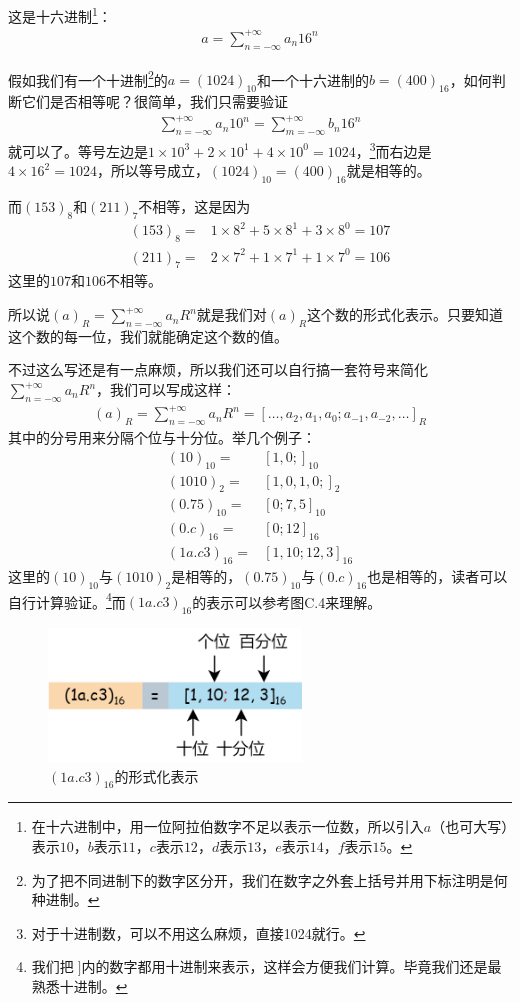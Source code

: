 这是十六进制\footnote{在十六进制中，用一位阿拉伯数字不足以表示一位数，所以引入$a$（也可大写）表示$10$，$b$表示$11$，$c$表示$12$，$d$表示$13$，$e$表示$14$，$f$表示$15$。}：
\begin{align*}
a=\sum_{n=-\infty}^{+\infty}a_n16^n
\end{align*}\par
假如我们有一个十进制\footnote{为了把不同进制下的数字区分开，我们在数字之外套上括号并用下标注明是何种进制。}的$a=(1024)_{10}$和一个十六进制的$b=(400)_{16}$，如何判断它们是否相等呢？很简单，我们只需要验证
\begin{align*}
\sum_{n=-\infty}^{+\infty}a_n10^n=\sum_{m=-\infty}^{+\infty}b_n16^n
\end{align*}
就可以了。等号左边是$1\times10^3+2\times10^1+4\times10^0=1024$，\footnote{对于十进制数，可以不用这么麻烦，直接1024就行。}而右边是$4\times16^2=1024$，所以等号成立，$(1024)_{10}=(400)_{16}$就是相等的。\par
而$(153)_8$和$(211)_7$不相等，这是因为
\begin{align*}
(153)_8={}&1\times8^2+5\times8^1+3\times8^0=107\\
(211)_7={}&2\times7^2+1\times7^1+1\times7^0=106
\end{align*}
这里的$107$和$106$不相等。\par
所以说$(a)_R=\sum_{n=-\infty}^{+\infty}a_nR^n$就是我们对$(a)_R$这个数的形式化表示。只要知道这个数的每一位，我们就能确定这个数的值。\par
不过这么写还是有一点麻烦，所以我们还可以自行搞一套符号来简化$\sum_{n=-\infty}^{+\infty}a_nR^n$，我们可以写成这样：
\begin{align*}
(a)_R=\sum_{n=-\infty}^{+\infty}a_nR^n=\left[\ldots,a_2,a_1,a_0;a_{-1},a_{-2},\ldots\right]_R
\end{align*}
其中的分号用来分隔个位与十分位。举几个例子：
\begin{align*}
(10)_{10}={}&\left[1,0;\right]_{10}\\
(1010)_2={}&\left[1,0,1,0;\right]_2\\
(0.75)_{10}={}&\left[0;7,5\right]_{10}\\
(0.c)_{16}={}&\left[0;12\right]_{16}\\
(1a.c3)_{16}={}&\left[1,10;12,3\right]_{16}
\end{align*}
这里的$(10)_{10}$与$(1010)_2$是相等的，$(0.75)_{10}$与$(0.c)_{16}$也是相等的，读者可以自行计算验证。\footnote{我们把$\;]$内的数字都用十进制来表示，这样会方便我们计算。毕竟我们还是最熟悉十进制。}而$(1a.c3)_{16}$的表示可以参考图C.4来理解。\par
\begin{figure}[htbp]
    \centering
    \includegraphics[width=0.6\textwidth]{../images/other_parts/C_formatted_representation_of_a_number_300.png}
    \caption{$(1a.c3)_{16}$的形式化表示}
\end{figure}
